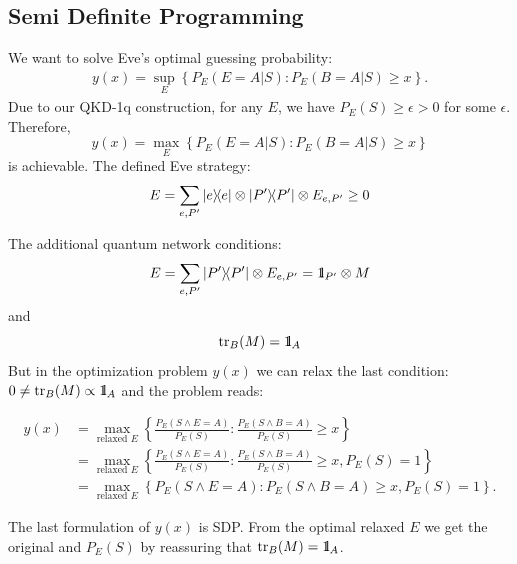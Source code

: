 \documentclass[a4paper,twocolumn,11pt,unpublished]{quantumarticle}
\newcommand{\Id}{{\rm 1\hspace{-0.9mm}l}}
\newcommand{\proj}[1]{\ensuremath{\ketbra{#1}{#1}}}
\begin{document}
\subsection{Semi Definite Programming}
We want to solve Eve's optimal guessing probability:
\begin{equation}
\begin{split}
   y(x) = \sup_E\left\{ P_E(E=A|S): P_E(B=A|S) \ge x\right\}.
\end{split}
\end{equation} 
Due to our QKD-1q construction, for any $E$, we have $P_E(S) \ge \epsilon > 0$
for some $\epsilon$.
Therefore,
\begin{equation}
y(x) = \max_E\left\{ P_E(E=A|S): P_E(B=A|S) \ge x\right\}
\end{equation}
is achievable. 
The defined Eve strategy:
\begin{equation}
E = \sum_{e,P'} \proj{e} \otimes \proj{P'} \otimes E_{e,P'} \ge 0
\end{equation}

The additional quantum network conditions: 
\begin{equation}
E = \sum_{e,P'} \proj{P'} \otimes E_{e,P'} = \Id_{P'} \otimes M
\end{equation}
and
\begin{equation}
\tr_{B}(M) = \Id_A
\end{equation}
But in the optimization problem $y(x)$ we can relax the last condition: $0 \neq
\tr_{B}(M) \propto \Id_A$ and the  problem reads:

\begin{widetext}
\begin{equation}
    \begin{split}
        y(x) &= \max_{\text{relaxed }E}\left\{ \frac{P_E(S \wedge E=A)}{P_E(S)}:
\frac{P_E(S \wedge B=A)}{P_E(S)} \ge x\right\}\\
        &= \max_{\text{relaxed }E}\left\{
        \frac{P_E(S \wedge E=A)}{P_E(S)}:
        \frac{P_E(S \wedge B=A)}{P_E(S)} \ge x, P_E(S)=1\right\}\\
        &= \max_{\text{relaxed }E}\left\{
        P_E(S \wedge E=A): P_E(S \wedge B=A) \ge x, P_E(S)=1\right\}.
    \end{split}
\end{equation}
\end{widetext}

The last formulation of $y(x)$ is SDP. From the optimal relaxed $E$ we get the
original and $P_E(S)$ by reassuring that $\tr_{B}(M) = \Id_A$.  \\
\end{document}
